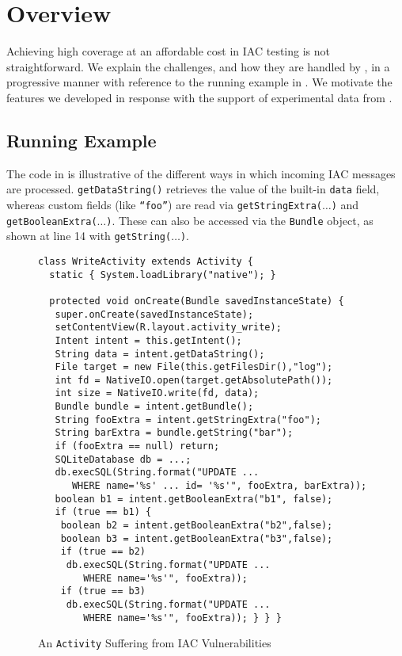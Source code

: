 \section{Overview}

Achieving high coverage at an affordable cost in IAC testing is not straightforward. We explain the challenges, and how they are handled by \Tool, in a progressive manner with reference to the running example in . We motivate the features we developed in response with the support of experimental data from .

\subsection{Running Example}

The code in  is illustrative of the different ways in which incoming IAC messages are processed. {\tt getDataString()} retrieves the value of the built-in {\tt data} field, whereas custom fields (like {\tt ``foo''}) are read via {\tt getStringExtra($\ldots$)} and {\tt getBooleanExtra($\ldots$)}. These can also be accessed via the {\tt Bundle} object, as shown at line 14 with {\tt getString($\ldots$)}.

\begin{figure}
	\begin{scriptsize}
	\begin{lstlisting}[showstringspaces=false]
class WriteActivity extends Activity {
  static { System.loadLibrary("native"); }

  protected void onCreate(Bundle savedInstanceState) {
   super.onCreate(savedInstanceState);
   setContentView(R.layout.activity_write);
   Intent intent = this.getIntent();
   String data = intent.getDataString();	
   File target = new File(this.getFilesDir(),"log");
   int fd = NativeIO.open(target.getAbsolutePath());	
   int size = NativeIO.write(fd, data);		 
   Bundle bundle = intent.getBundle();
   String fooExtra = intent.getStringExtra("foo");
   String barExtra = bundle.getString("bar");		
   if (fooExtra == null) return;	
   SQLiteDatabase db = ...;
   db.execSQL(String.format("UPDATE ... 
      WHERE name='%s' ... id= '%s'", fooExtra, barExtra));	
   boolean b1 = intent.getBooleanExtra("b1", false);
   if (true == b1) {
    boolean b2 = intent.getBooleanExtra("b2",false);
    boolean b3 = intent.getBooleanExtra("b3",false);
    if (true == b2)
     db.execSQL(String.format("UPDATE ... 
        WHERE name='%s'", fooExtra));
    if (true == b3)
     db.execSQL(String.format("UPDATE ... 
        WHERE name='%s'", fooExtra)); } } }
	\end{lstlisting}
		\end{scriptsize}
	\caption{\label{Fi:techExample}An \texttt{Activity} Suffering from IAC Vulnerabilities}
\end{figure}

